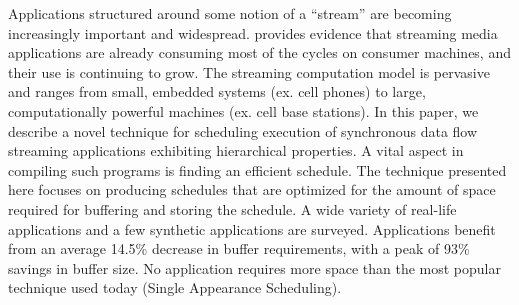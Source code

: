 Applications structured around some notion of a ``stream'' are
becoming increasingly important and widespread. \cite{Rix98} provides
evidence that streaming media applications are already consuming most
of the cycles on consumer machines, and their use is continuing to
grow. The streaming computation model is pervasive and ranges from
small, embedded systems (ex. cell phones) to large, computationally
powerful machines (ex. cell base stations). In this paper, we describe
a novel technique for scheduling execution of synchronous data flow
streaming applications exhibiting hierarchical properties. A vital
aspect in compiling such programs is finding an efficient
schedule. The technique presented here focuses on producing schedules
that are optimized for the amount of space required for buffering and
storing the schedule. A wide variety of real-life applications and a
few synthetic applications are surveyed. Applications benefit from an
average 14.5\% decrease in buffer requirements, with a peak of 93\%
savings in buffer size. No application requires more space than the
most popular technique used today (Single Appearance Scheduling).
